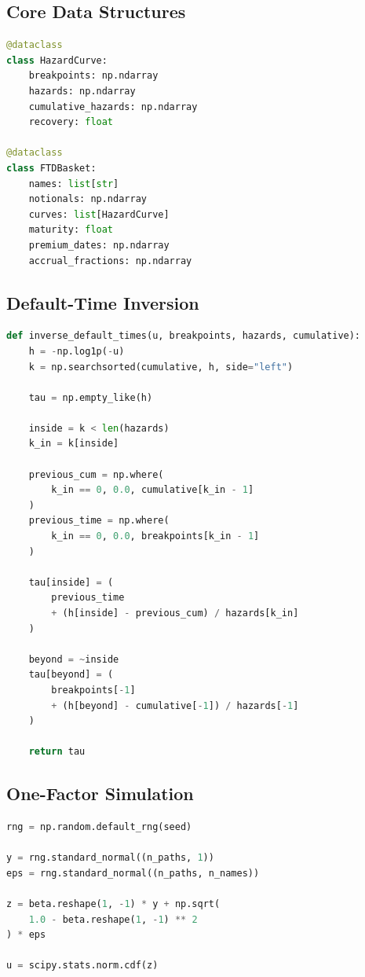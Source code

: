 \documentclass[11pt,a4paper]{article}
\begin{document}
\subsection{Core Data Structures}

\begin{lstlisting}[language=Python]
@dataclass
class HazardCurve:
    breakpoints: np.ndarray
    hazards: np.ndarray
    cumulative_hazards: np.ndarray
    recovery: float

@dataclass
class FTDBasket:
    names: list[str]
    notionals: np.ndarray
    curves: list[HazardCurve]
    maturity: float
    premium_dates: np.ndarray
    accrual_fractions: np.ndarray
\end{lstlisting}

\subsection{Default-Time Inversion}

\begin{lstlisting}[language=Python]
def inverse_default_times(u, breakpoints, hazards, cumulative):
    h = -np.log1p(-u)
    k = np.searchsorted(cumulative, h, side="left")

    tau = np.empty_like(h)

    inside = k < len(hazards)
    k_in = k[inside]

    previous_cum = np.where(
        k_in == 0, 0.0, cumulative[k_in - 1]
    )
    previous_time = np.where(
        k_in == 0, 0.0, breakpoints[k_in - 1]
    )

    tau[inside] = (
        previous_time
        + (h[inside] - previous_cum) / hazards[k_in]
    )

    beyond = ~inside
    tau[beyond] = (
        breakpoints[-1]
        + (h[beyond] - cumulative[-1]) / hazards[-1]
    )

    return tau
\end{lstlisting}

\subsection{One-Factor Simulation}

\begin{lstlisting}[language=Python]
rng = np.random.default_rng(seed)

y = rng.standard_normal((n_paths, 1))
eps = rng.standard_normal((n_paths, n_names))

z = beta.reshape(1, -1) * y + np.sqrt(
    1.0 - beta.reshape(1, -1) ** 2
) * eps

u = scipy.stats.norm.cdf(z)
\end{lstlisting}
\end{document}
